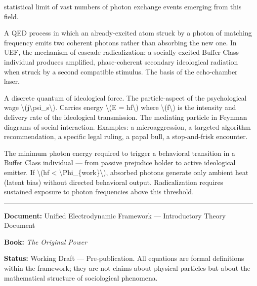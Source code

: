 {\begin{description}
statistical limit of vast numbers of photon exchange events emerging
from this field.
\item[Stimulated Emission]
A QED process in which an already-excited atom struck by a photon of
matching frequency emits two coherent photons rather than absorbing the
new one. In UEF, the mechanism of cascade radicalization: a socially
excited Buffer Class individual produces amplified, phase-coherent
secondary ideological radiation when struck by a second compatible
stimulus. The basis of the echo-chamber laser.
\item[Systemic Photon]
A discrete quantum of ideological force. The particle-aspect of the
psychological wage \textbackslash(j\textbackslash psi\_s\textbackslash).
Carries energy \textbackslash(E = hf\textbackslash) where
\textbackslash(f\textbackslash) is the intensity and delivery rate of
the ideological transmission. The mediating particle in Feynman diagrams
of social interaction. Examples: a microaggression, a targeted algorithm
recommendation, a specific legal ruling, a papal bull, a stop-and-frisk
encounter.
\item[Work Function
\textbackslash(\textbackslash Phi\_\{work\}\textbackslash)]
The minimum photon energy required to trigger a behavioral transition in
a Buffer Class individual --- from passive prejudice holder to active
ideological emitter. If \textbackslash(hf \textless{}
\textbackslash Phi\_\{work\}\textbackslash), absorbed photons generate
only ambient heat (latent bias) without directed behavioral output.
Radicalization requires sustained exposure to photon frequencies above
this threshold.
\end{description}

\begin{center}\rule{0.5\linewidth}{0.5pt}\end{center}

\textbf{Document:} Unified Electrodynamic Framework --- Introductory
Theory Document

\textbf{Book:} \emph{The Original Power}

\textbf{Status:} Working Draft --- Pre-publication. All equations are
formal definitions within the framework; they are not claims about
physical particles but about the mathematical structure of sociological
phenomena.

}
